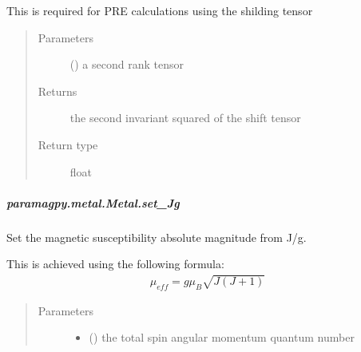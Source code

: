 \documentclass[a4paper,10pt,english,openany,oneside]{sphinxmanual}
\begin{document}
\begin{fulllineitems}
\begin{fulllineitems}
\begin{fulllineitems}
\sphinxAtStartPar
This is required for PRE calculations using the shilding tensor
\begin{quote}\begin{description}
\item[{Parameters}] \leavevmode
\sphinxAtStartPar
{} () \textendash{} a second rank tensor

\item[{Returns}] \leavevmode
\sphinxAtStartPar
{} \textendash{} the second invariant squared of the shift tensor

\item[{Return type}] \leavevmode
\sphinxAtStartPar
float

\end{description}\end{quote}

\end{fulllineitems}



\subparagraph{paramagpy.metal.Metal.set\_Jg}
\label{\detokenize{reference/generated/paramagpy.metal.Metal.set_Jg:paramagpy-metal-metal-set-jg}}\label{\detokenize{reference/generated/paramagpy.metal.Metal.set_Jg::doc}}

\begin{fulllineitems}
\label{\detokenize{reference/generated/paramagpy.metal.Metal.set_Jg:paramagpy.metal.Metal.set_Jg}}
\sphinxAtStartPar
Set the magnetic susceptibility absolute magnitude from J/g.

\sphinxAtStartPar
This is achieved using the following formula:
\begin{equation*}
\begin{split}\mu_{eff}=g\mu_B\sqrt{J(J+1)}\end{split}
\end{equation*}\begin{quote}\begin{description}
\item[{Parameters}] \leavevmode\begin{itemize}
\item {} 
\sphinxAtStartPar
{} () \textendash{} the total spin angular momentum quantum number


\end{itemize}
\end{description}
\end{quote}
\end{fulllineitems}
\end{fulllineitems}
\end{fulllineitems}
\end{document}
